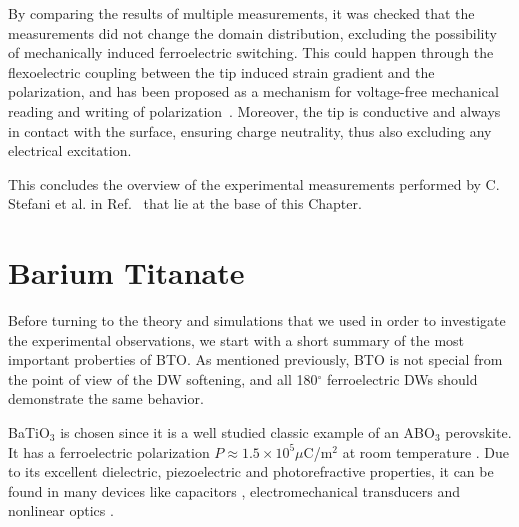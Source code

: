 By comparing the results of multiple measurements, it was checked that the measurements did not change the domain distribution, excluding the possibility of mechanically induced ferroelectric switching.
This could happen through the flexoelectric coupling between the tip induced strain gradient and the polarization, and has been proposed as a mechanism for voltage-free mechanical reading and writing of polarization~\cite{Cordero-Edwards2017,Cordero-Edwards2019,Abdollahi2015}.
Moreover, the tip is conductive and always in contact with the surface, ensuring charge neutrality, thus also excluding any electrical excitation.

This concludes the overview of the experimental measurements performed by C. Stefani et al. in Ref.~\cite{Stefani2020} that lie at the base of this Chapter.

\section{Barium Titanate}
Before turning to the theory and simulations that we used in order to investigate the experimental observations, we start with a short summary of the most important proberties of BTO.
As mentioned previously, BTO is not special from the point of view of the DW softening, and all 180$^\circ$ ferroelectric DWs should demonstrate the same behavior.

BaTiO$_3$ is chosen since it is a well studied classic example of an ABO$_3$ perovskite.
It has a ferroelectric polarization $P \approx 1.5 \times 10^5 \mu $C/m$^2$ at room temperature \cite{Mason1948, VonHippel1950}.
Due to its excellent dielectric, piezoelectric and photorefractive properties, it can be found in many devices like capacitors \cite{American1963}, electromechanical transducers \cite{Schofield1957} and nonlinear optics \cite{Ramakanth2015}.

